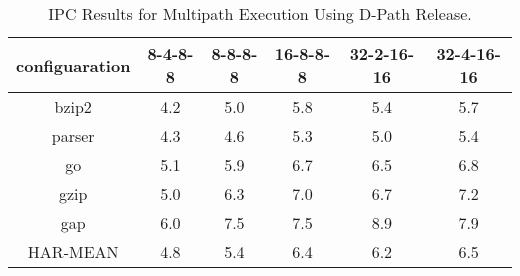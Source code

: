 \begin{table}
\begin{center}
\caption{IPC Results for Multipath Execution Using D-Path Release.}
\label{tab:ipc1}
\begin{tabular}{|c|c|c|c|c|c|}
\hline 
configuaration&
8-4-8-8&
8-8-8-8&
16-8-8-8&
32-2-16-16&
32-4-16-16\\
\hline
bzip2&4.2&5.0&5.8&5.4&5.7\\
\hline 
parser&4.3&4.6&5.3&5.0&5.4\\
\hline 
go&5.1&5.9&6.7&6.5&6.8\\
\hline 
gzip&5.0&6.3&7.0&6.7&7.2\\
\hline 
gap&6.0&7.5&7.5&8.9&7.9\\
\hline 
\hline 
HAR-MEAN&4.8&5.4&6.4&6.2&6.5\\
\hline
\end{tabular}
\end{center}
\end{table}
